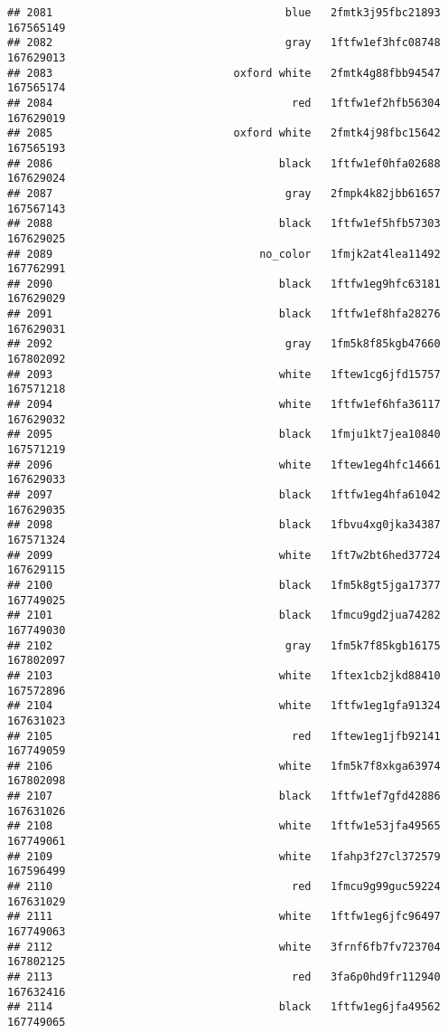 \documentclass[
]{article}
\begin{document}
\begin{verbatim}
## 2081                                    blue   2fmtk3j95fbc21893 167565149
## 2082                                    gray   1ftfw1ef3hfc08748 167629013
## 2083                            oxford white   2fmtk4g88fbb94547 167565174
## 2084                                     red   1ftfw1ef2hfb56304 167629019
## 2085                            oxford white   2fmtk4j98fbc15642 167565193
## 2086                                   black   1ftfw1ef0hfa02688 167629024
## 2087                                    gray   2fmpk4k82jbb61657 167567143
## 2088                                   black   1ftfw1ef5hfb57303 167629025
## 2089                                no_color   1fmjk2at4lea11492 167762991
## 2090                                   black   1ftfw1eg9hfc63181 167629029
## 2091                                   black   1ftfw1ef8hfa28276 167629031
## 2092                                    gray   1fm5k8f85kgb47660 167802092
## 2093                                   white   1ftew1cg6jfd15757 167571218
## 2094                                   white   1ftfw1ef6hfa36117 167629032
## 2095                                   black   1fmju1kt7jea10840 167571219
## 2096                                   white   1ftew1eg4hfc14661 167629033
## 2097                                   black   1ftfw1eg4hfa61042 167629035
## 2098                                   black   1fbvu4xg0jka34387 167571324
## 2099                                   white   1ft7w2bt6hed37724 167629115
## 2100                                   black   1fm5k8gt5jga17377 167749025
## 2101                                   black   1fmcu9gd2jua74282 167749030
## 2102                                    gray   1fm5k7f85kgb16175 167802097
## 2103                                   white   1ftex1cb2jkd88410 167572896
## 2104                                   white   1ftfw1eg1gfa91324 167631023
## 2105                                     red   1ftew1eg1jfb92141 167749059
## 2106                                   white   1fm5k7f8xkga63974 167802098
## 2107                                   black   1ftfw1ef7gfd42886 167631026
## 2108                                   white   1ftfw1e53jfa49565 167749061
## 2109                                   white   1fahp3f27cl372579 167596499
## 2110                                     red   1fmcu9g99guc59224 167631029
## 2111                                   white   1ftfw1eg6jfc96497 167749063
## 2112                                   white   3frnf6fb7fv723704 167802125
## 2113                                     red   3fa6p0hd9fr112940 167632416
## 2114                                   black   1ftfw1eg6jfa49562 167749065

\end{verbatim}
\end{document}
